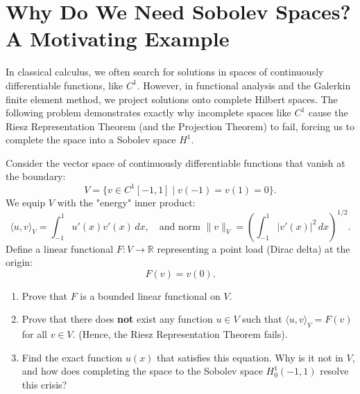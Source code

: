 \documentclass{article}
\begin{document}
\section{Why Do We Need Sobolev Spaces? A Motivating Example}

\begin{remark}
    In classical calculus, we often search for solutions in spaces of continuously differentiable functions, like $C^1$. However, in functional analysis and the Galerkin finite element method, we project solutions onto complete Hilbert spaces. The following problem demonstrates exactly why incomplete spaces like $C^1$ cause the Riesz Representation Theorem (and the Projection Theorem) to fail, forcing us to complete the space into a Sobolev space $H^1$.
\end{remark}

\begin{problem}
    Consider the vector space of continuously differentiable functions that vanish at the boundary:
    \[ V = \{ v \in C^1[-1, 1] \mid v(-1) = v(1) = 0 \}. \]
    We equip $V$ with the "energy" inner product:
    \[ \langle u, v \rangle_V = \int_{-1}^1 u'(x) v'(x) \, dx, \quad \text{and norm } \|v\|_V = \left( \int_{-1}^1 |v'(x)|^2 \, dx \right)^{1/2}. \]
    Define a linear functional $F: V \to \mathbb{R}$ representing a point load (Dirac delta) at the origin:
    \[ F(v) = v(0). \]
    \begin{enumerate}
        \item[(a)] Prove that $F$ is a bounded linear functional on $V$.
        \item[(b)] Prove that there does \textbf{not} exist any function $u \in V$ such that $\langle u, v \rangle_V = F(v)$ for all $v \in V$. (Hence, the Riesz Representation Theorem fails).
        \item[(c)] Find the exact function $u(x)$ that satisfies this equation. Why is it not in $V$, and how does completing the space to the Sobolev space $H_0^1(-1, 1)$ resolve this crisis?
    \end{enumerate}
\end{problem}
\end{document}
